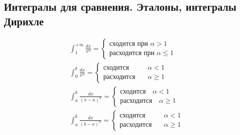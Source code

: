 \subsection{Интегралы для сравнения. Эталоны, интегралы Дирихле}
\begin{gather*}
    \boxed{\int_{1}^{+\infty} \frac{dx}{x^\alpha} = \left\{ \begin{aligned}
        \text{сходится при } \alpha > 1 \\
        \text{расходится при } \alpha \leqslant 1
    \end{aligned} \right.} \\[1ex]
    \boxed{\int_{0}^{b} \frac{dx}{x^\alpha} = \left\{ \begin{aligned}
        \text{сходится}\quad &\alpha < 1 \\
        \text{расходится}\quad &\alpha \geqslant 1
    \end{aligned} \right. } \\[1ex]
    \boxed{\int_{a}^{b} \frac{dx}{(x - a)^\alpha} = \left\{ \begin{aligned}
        \text{сходится}\quad \alpha < 1 \\
        \text{расходится}\quad \alpha \geqslant 1
    \end{aligned} \right.} \\[1ex]
    \boxed{\int_{a}^{b} \frac{dx}{(b - x)^\alpha} = \left\{ \begin{aligned}
        \text{сходится}\quad &\alpha < 1 \\
        \text{расходится}\quad &\alpha \geqslant 1
    \end{aligned} \right. }
\end{gather*}

